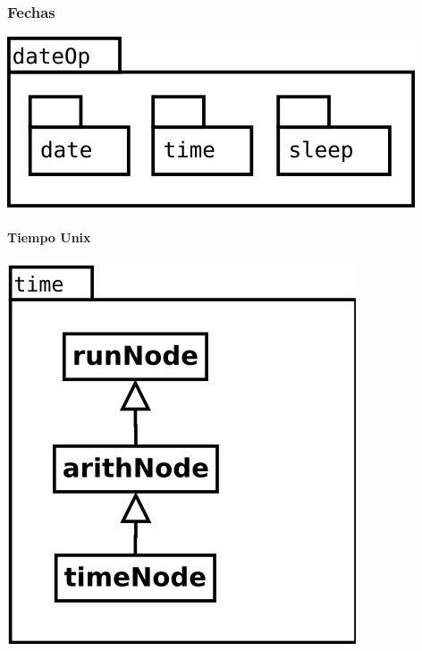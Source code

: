 \begin{multicols}{2}
\subsubsection {Fechas}
   \begin{center}
   \includegraphics[scale=0.4]{dateOp-package.png} \\
   \end{center}
   \paragraph {Tiempo Unix} 
   \begin{center}
   \includegraphics[scale=0.4]{time.png} \\
   \end{center}
\columnbreak

\end{multicols}
